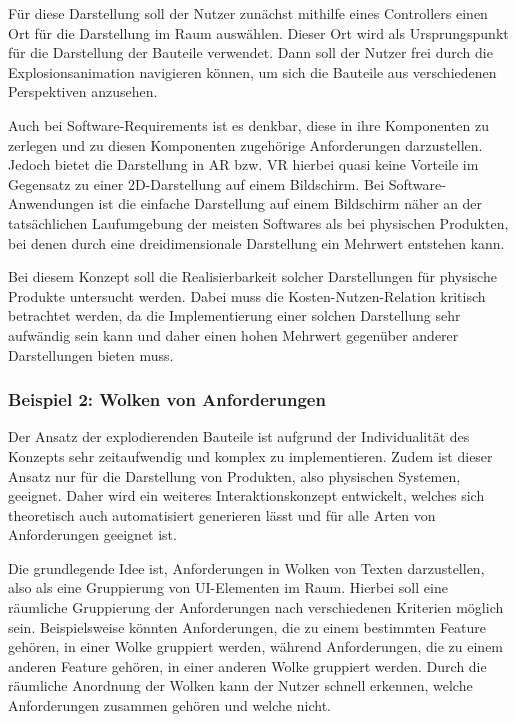 Für diese Darstellung soll der Nutzer zunächst mithilfe eines Controllers einen Ort für die Darstellung im Raum auswählen.
Dieser Ort wird als Ursprungspunkt für die Darstellung der Bauteile verwendet.
Dann soll der Nutzer frei durch die Explosionsanimation navigieren können, um sich die Bauteile aus verschiedenen Perspektiven anzusehen.

Auch bei Software-Requirements ist es denkbar, diese in ihre Komponenten zu zerlegen und zu diesen Komponenten zugehörige Anforderungen darzustellen.
Jedoch bietet die Darstellung in AR bzw. VR hierbei quasi keine Vorteile im Gegensatz zu einer 2D-Darstellung auf einem Bildschirm.
Bei Software-Anwendungen ist die einfache Darstellung auf einem Bildschirm näher an der tatsächlichen Laufumgebung der meisten Softwares als bei physischen Produkten, bei denen durch eine dreidimensionale Darstellung ein Mehrwert entstehen kann.

Bei diesem Konzept soll die Realisierbarkeit solcher Darstellungen für physische Produkte untersucht werden.
Dabei muss die Kosten-Nutzen-Relation kritisch betrachtet werden, da die Implementierung einer solchen Darstellung sehr aufwändig sein kann und daher einen hohen Mehrwert gegenüber anderer Darstellungen bieten muss.

\subsubsection{Beispiel 2: Wolken von Anforderungen}

Der Ansatz der explodierenden Bauteile ist aufgrund der Individualität des Konzepts sehr zeitaufwendig und komplex zu implementieren.
Zudem ist dieser Ansatz nur für die Darstellung von Produkten, also physischen Systemen, geeignet.
Daher wird ein weiteres Interaktionskonzept entwickelt, welches sich theoretisch auch automatisiert generieren lässt und für alle Arten von Anforderungen geeignet ist.

Die grundlegende Idee ist, Anforderungen in Wolken von Texten darzustellen, also als eine Gruppierung von UI-Elementen im Raum.
Hierbei soll eine räumliche Gruppierung der Anforderungen nach verschiedenen Kriterien möglich sein.
Beispielsweise könnten Anforderungen, die zu einem bestimmten Feature gehören, in einer Wolke gruppiert werden, während Anforderungen, die zu einem anderen Feature gehören, in einer anderen Wolke gruppiert werden.
Durch die räumliche Anordnung der Wolken kann der Nutzer schnell erkennen, welche Anforderungen zusammen gehören und welche nicht.


